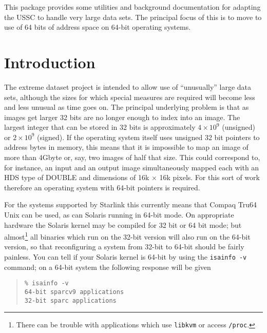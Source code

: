 \documentclass[twoside,11pt]{article}
\newcommand{\stardocinitials}  {SSN}
\newcommand{\stardocnumber}    {73.1}
\newcommand{\stardocabstract}  {
This package provides some utilities and background documentation 
for adapting the USSC to handle very large data sets.
The principal focus of this is to move to use of 64 bits of address
space on 64-bit operating systems.
}
\newcommand{\stardocname}{\stardocinitials /\stardocnumber}
\newenvironment{latexonly}{}{}
\renewcommand{\_}{\texttt{\symbol{95}}}
\renewcommand{\thepage}{\roman{page}}
\begin{document}
\stardocabstract
  \newpage
  \begin{latexonly}
    \setlength{\parskip}{0mm}
    \tableofcontents
    \setlength{\parskip}{\medskipamount}
    \markboth{\stardocname}{\stardocname}
  \end{latexonly}
\cleardoublepage
\renewcommand{\thepage}{\arabic{page}}
\setcounter{page}{1}


\section{Introduction}

The extreme dataset project is intended to allow use of ``unusually''
large data sets, although the sizes for which special measures
are required will become less and less unusual as time goes on.
The principal underlying problem is that as images get larger
32 bits are no longer enough to index into an image.
The largest integer that can be stored in 32 bits 
is approximately $4 \times 10^9$ (unsigned) or $2 \times 10^9$ (signed).
If the operating system itself uses unsigned 32 bit pointers to 
address bytes
in memory, this means that it is impossible to map an image of more
than 4Gbyte or, say, two images of half that size. 
This could correspond to, for instance, an input and an output image
simultaneously mapped each with an HDS type of \_DOUBLE and 
dimensions of 16k $\times$ 16k pixels.  
For this sort of work therefore an operating system with 64-bit 
pointers is required.

For the systems supported by
Starlink this currently means that Compaq Tru64 Unix can be used,
as can Solaris running in 64-bit mode.  
On appropriate hardware the Solaris kernel 
may be compiled for 32 bit or 64 bit mode;
but almost\footnote{
   There can be trouble with applications which use 
   {\tt libkvm} or access {\tt /proc}.}
all binaries which run on the 32-bit version
will also run on the 64-bit version, 
so that reconfiguring a system from 32-bit to 64-bit should be
fairly painless.
You can tell if your Solaris kernel is 64-bit 
by using the {\tt isainfo -v} command; on a 64-bit system the
following response will be given
\begin{quote}
\begin{verbatim}
% isainfo -v
64-bit sparcv9 applications
32-bit sparc applications
\end{verbatim}
\end{quote}
\end{document}
